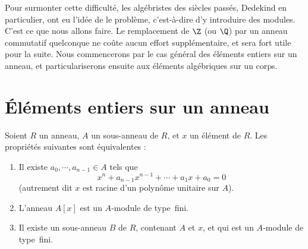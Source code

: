 \documentclass[11pt, useosf,
  title in boldface,
  theorem in new line,
  theorem numbering = section,
  number theorems separately,
]{simplivre}
\begin{document}
Pour surmonter cette difficulté, les algébristes des siècles passés, Dedekind en particulier, ont eu l'idée de  le problème, c'est-à-dire d'y introduire des modules. C'est ce que nous allons faire. Le remplacement de \( \Z \) (ou \( \Q \)) par un anneau commutatif quelconque ne coûte aucun effort supplémentaire, et sera fort utile pour la suite. Nous commencerons par le cas général des éléments entiers sur un anneau, et particulariserons ensuite aux éléments algébriques sur un corps.

\section{Éléments entiers sur un anneau}

\enlargethispage*{\baselineskip}
    \begin{theorem}\label{thm:conditions d'être entier}
        Soient \( R \) un anneau, \( A \) un sous-anneau de \( R \), et \( x \) un élément de \( R \). Les propriétés suivantes sont équivalentes :
        \begin{enumerate}
            \item \label{thm:conditions d'être entier;item1} Il existe \( a_0, \cdots, a_{n-1} \in A \) tels que
            \begin{equation}
                x^n + a_{n-1} x^{n-1} + \cdots + a_1 x + a_0 = 0
            \end{equation}
            (autrement dit \( x \) est racine d'un polynôme unitaire sur \( A \)).
            \item \label{thm:conditions d'être entier;item2} L'anneau \( A[x] \) est un \( A \)‑module de type~fini.
            \item \label{thm:conditions d'être entier;item3} Il existe un sous-anneau \( B \) de \( R \), contenant \( A \) et \( x \), et qui est un \( A \)‑module de type~fini.
        \end{enumerate}
    \end{theorem}
\end{document}
